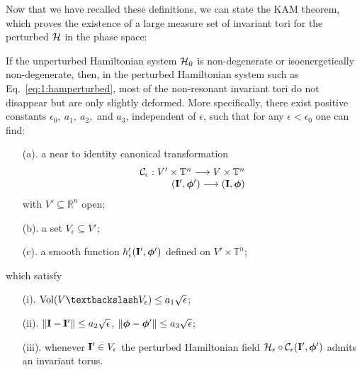 Now that we have recalled these definitions, we can state the KAM theorem, which proves the existence of a large measure set of invariant tori for the perturbed $\mathcal{H}$ in the phase space:
\begin{theorem}\label{th:kam}
If the unperturbed Hamiltonian system $\mathcal{H}_0$ is non-degenerate or isoenergetically non-degenerate, then, in the perturbed Hamiltonian system such as Eq.~\eqref{eq:1:hamperturbed}, most of the non-resonant invariant tori do not disappear but are only slightly deformed. More specifically, there exist positive constants $\epsilon_0,\ a_1,\ a_2,$ and $a_3$, independent of $\epsilon$, such that for any $\epsilon < \epsilon_0$ one can find:
\begin{enumerate}
    \item [(a).] a near to identity canonical transformation
    \begin{equation}
        \begin{array}{r}
        \mathcal{C}_\epsilon: V'\times\mathbb{T}^{n} \longrightarrow V\times\mathbb{T}^n \\
        (\vb{I}', \boldsymbol{\phi}') \longrightarrow(\vb{I}, \boldsymbol{\phi})
        \end{array}
    \end{equation}
    with $V' \subseteq \mathbb{R}^n$ open;
    \item [(b).] a set $V_\epsilon \subseteq V'$;
    \item [(c).] a smooth function $h'_\epsilon(\vb{I}', \boldsymbol{\phi}')$ defined on $V'\times \mathbb{T}^n$;
\end{enumerate}
which satisfy
\begin{enumerate}
    \item [(i).] $\operatorname{Vol}(V\textbackslash V_\epsilon) \leq a_1\sqrt{\epsilon}$;
    \item [(ii).] $\norm{\vb{I}-\vb{I}'}\leq a_2 \sqrt{\epsilon}$, $\norm{\boldsymbol{\phi} - \boldsymbol{\phi}'} \leq a_3 \sqrt{\epsilon}$;
    \item [(iii).] whenever $\vb{I}'\in V_\epsilon$ the perturbed Hamiltonian field $\mathcal{H}_\epsilon \circ \mathcal{C}_\epsilon (\vb{I}', \boldsymbol{\phi}')$ admits an invariant torus.
\end{enumerate}

\end{theorem}

